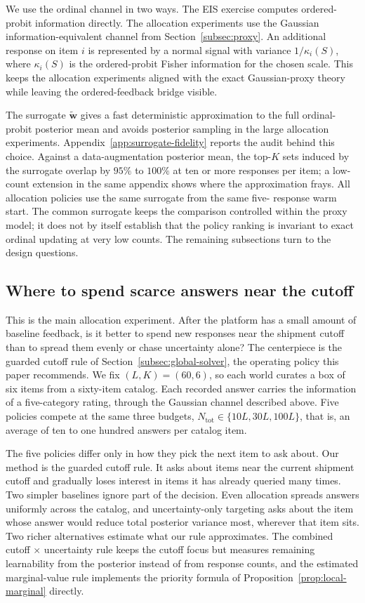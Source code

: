 \documentclass[11pt]{article}
\theoremstyle{definition}
\theoremstyle{remark}
\newcommand{\1}{\mathbf{1}}
\newcommand{\w}{\mathbf{w}}
\begin{document}
We use the ordinal channel in two ways. The EIS exercise computes
ordered-probit information directly. The allocation experiments use the
Gaussian information-equivalent channel from Section~\ref{subsec:proxy}. An
additional response on item \(i\) is represented by a normal signal with
variance \(1/\kappa_i(S)\), where \(\kappa_i(S)\) is the ordered-probit
Fisher information for the chosen scale. This keeps the allocation
experiments aligned with the exact Gaussian-proxy theory while leaving
the ordered-feedback bridge visible.

The surrogate $\tilde{\w}$ gives a fast deterministic approximation to
the full ordinal-probit posterior mean and avoids posterior sampling in
the large allocation experiments. Appendix~\ref{app:surrogate-fidelity}
reports the audit behind this choice. Against a data-augmentation
posterior mean, the top-\(K\) sets induced by the surrogate overlap by
\(95\%\) to \(100\%\) at ten or more responses per item; a low-count extension in the same appendix shows where the approximation
frays. All allocation policies use the same surrogate from the same five-
response warm start. The common surrogate keeps the comparison
controlled within the proxy model; it does not by itself establish that
the policy ranking is invariant to exact ordinal updating at very low
counts. The remaining subsections turn to the design questions.

\subsection[Where to spend scarce answers]{Where to spend scarce answers near the cutoff}\label{subsec:design-allocation}

This is the main allocation experiment. After the platform has a small
amount of baseline feedback, is it better to spend new responses near
the shipment cutoff than to spread them evenly or chase uncertainty
alone? The centerpiece is the guarded cutoff rule of
Section~\ref{subsec:global-solver}, the operating policy this paper
recommends. We fix $(L,K)=(60,6)$, so each world curates a box of six
items from a sixty-item catalog. Each recorded answer carries the
information of a five-category rating, through the Gaussian channel
described above. Five policies compete at the same three budgets,
\(N_{\mathrm{tot}}\in\{10L,30L,100L\}\), that is, an average of ten to
one hundred answers per catalog item.

The five policies differ only in how they pick the next item to ask
about. Our method is the guarded cutoff rule. It asks about items near
the current shipment cutoff and gradually loses interest in items it
has already queried many times. Two simpler baselines ignore part of
the decision. Even allocation spreads answers uniformly across the
catalog, and uncertainty-only targeting asks about the item whose
answer would reduce total posterior variance most, wherever that item
sits. Two richer alternatives estimate what our rule approximates. The
combined cutoff \(\times\) uncertainty rule keeps the cutoff focus but
measures remaining learnability from the posterior instead of from
response counts, and the estimated marginal-value rule implements the
priority formula of Proposition~\ref{prop:local-marginal} directly.
\end{document}
